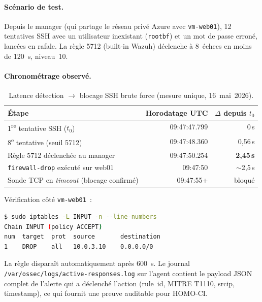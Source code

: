 \paragraph{Scénario de test.} Depuis le manager (qui partage le
réseau privé Azure avec \texttt{vm-web01}), 12 tentatives SSH
avec un utilisateur inexistant (\texttt{rootbf}) et un mot de
passe erroné, lancées en rafale. La règle 5712 (built-in Wazuh)
déclenche à 8~échecs en moins de 120~s, niveau~10.

\paragraph{Chronométrage observé.}

\begin{table}[h]
\centering
\caption{Latence détection $\to$ blocage SSH brute force (mesure
unique, 16~mai~2026).}
\label{tab:active-response}
\small
\begin{tabular}{lrr}
\toprule
\textbf{Étape} & \textbf{Horodatage UTC} & \textbf{$\Delta$ depuis $t_0$} \\
\midrule
1\textsuperscript{re} tentative SSH ($t_0$) & 09:47:47.799 & 0\,s \\
8\textsuperscript{e} tentative (seuil 5712) & 09:47:48.360 & 0,56\,s \\
Règle 5712 déclenchée au manager & 09:47:50.254 & \textbf{2,45\,s} \\
\texttt{firewall-drop} exécuté sur web01 & 09:47:50 & $\sim$2,5\,s \\
Sonde TCP en \emph{timeout} (blocage confirmé) & 09:47:55+ & bloqué \\
\bottomrule
\end{tabular}
\end{table}

Vérification côté \texttt{vm-web01}~:

\begin{lstlisting}[language=bash,caption={État iptables après
déclenchement.}]
$ sudo iptables -L INPUT -n --line-numbers
Chain INPUT (policy ACCEPT)
num  target  prot  source       destination
1    DROP    all   10.0.3.10    0.0.0.0/0
\end{lstlisting}

La règle disparaît automatiquement après 600~s. Le journal
\texttt{/var/ossec/logs/active-responses.log} sur l'agent
contient le payload JSON complet de l'alerte qui a déclenché
l'action (rule~id, MITRE T1110, srcip, timestamp), ce qui
fournit une preuve auditable pour HOMO-CI.

